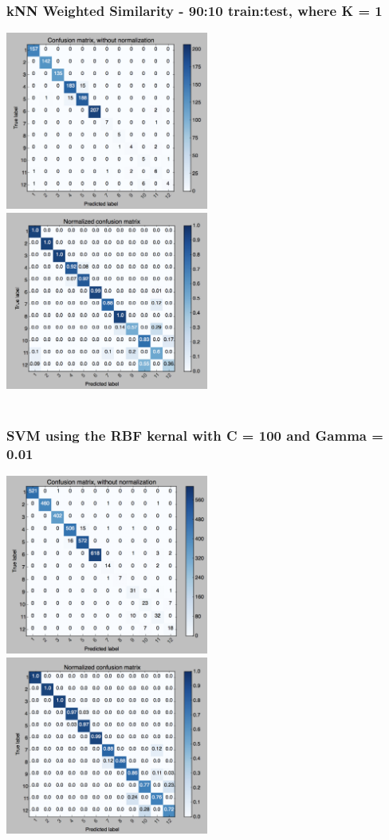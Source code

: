 \documentclass[paper=a4, fontsize=11pt]{scrartcl}
\numberwithin{equation}{section}		%
\numberwithin{figure}{section}			%
\numberwithin{table}{section}				%
\begin{document}
\subsubsection{kNN Weighted Similarity - 90:10 train:test, where K = 1}
\includegraphics[width=0.5\textwidth]{third.png}
\includegraphics[width=0.5\textwidth]{thirdN.png}
\\
\\
\subsubsection{SVM using the RBF kernal with C = 100 and Gamma = 0.01}
\includegraphics[width=0.5\textwidth]{fourth.png}
\includegraphics[width=0.5\textwidth]{fourthN.png}
\\
\end{document}

